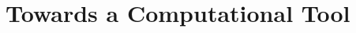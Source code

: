 \documentclass[../Dissertation.tex]{subfiles}
\begin{document}
\section{Towards a Computational Tool}





\end{document}
